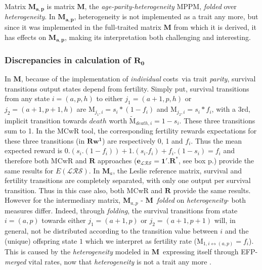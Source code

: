 \documentclass[10pt,a4paper]{article}
\newcommand{\M}{$\mathbf{M}$}
\newcommand{\PCoR}{\emph{individual} costs}
\begin{document}
Matrix $\mathbf{M_{a,p}}$ is matrix $\mathbf{M}$, the \textit{age-parity-heterogeneity} MPPM, \textit{folded} over \textit{heterogeneity}.  In $\mathbf{M_{a,p}}$, heterogeneity is not implemented as a trait any more, but since it was implemented in the full-traited matrix  $\mathbf{M}$ from which it is derived, it has effects on $\mathbf{M_{a,p}}$, making its interpretation both challenging and interesting.

\subsubsection*{Discrepancies in calculation of \texorpdfstring{$\mathbf{R_{0}}$}{R0}}

 In $\mathbf{M}$, because of the implementation of \PCoR\ via trait \emph{parity}, survival transitions output states depend from fertility.  Simply put, survival transitions from any state $i=(a,p,h)$ to either $j_1=(a+1,p,h)$ or $j_2=(a+1,p+1,h)$ are $\mathrm{M}_{j_{1},i}=s_{i}*(1-f_{i})$ and $\mathrm{M}_{j_{2},i}=s_{i}*f_{i}$, with a 3rd, implicit transition towards $death$ worth $\mathrm{\tilde{M}}_{death,i}=1-s_{i}$. These three transitions sum to 1.
In the MCwR tool, the corresponding fertility rewards expectations for these three transitions (in $\mathbf{Rw^{1}}$) are respectively 0, 1 and $f_{i}$. Thus the mean expected reward is $0. (s_{i}.(1-f_{i}))+1.(s_{i}.f_{i})+f_{i}.(1-s_{i})=f_{i}$  and therefore both MCwR and $\mathbf{R}$ approaches ($\mathbf{e}_{\mathcal{LRS}}=\mathbf{1}'.\mathbf{R^{*}}$, see box p.\pageref{box:noteonR0}) provide the same results for $E(\mathcal{LRS})$.
In $\mathbf{M}_a$, the Leslie reference matrix, survival and fertility transitions are completely separated, with only one output per survival transition. Thus in this case also, both MCwR and $\mathbf{R}$ provide the same results.\\

However for the intermediary matrix, $\mathbf{M}_{a,p}$ - \M\ \emph{folded} on \emph{heterogeneity}- both measures differ. Indeed, through \emph{folding}, the survival transitions  from state $i=(a,p)$ towards either $j_1=(a+1,p)$ or $j_2=(a+1,p+1)$ will, in general, not be distributed according to the transition value between $i$ and the (unique) offspring state $1$ which we interpret as fertility rate ($\mathrm{M}_{1,i\leftrightarrow (a,p)}=f_{i}$). This is caused by the \emph{heterogeneity} modeled in \M\ expressing itself through EFP-\emph{merged} vital rates, now that \emph{heterogeneity} is not a trait any more \citep[see][]{Coste2017}.\\
\end{document}

